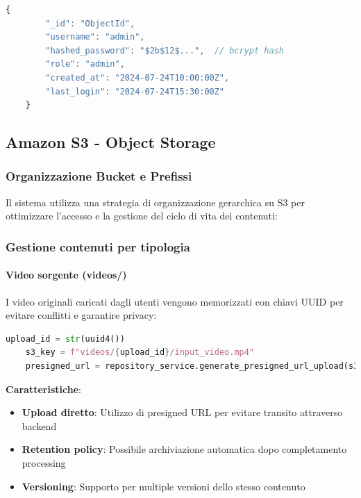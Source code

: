 \begin{lstlisting}[language=javascript, caption=Struttura utente]
	{
		"_id": "ObjectId",
		"username": "admin",
		"hashed_password": "$2b$12$...",  // bcrypt hash
		"role": "admin",
		"created_at": "2024-07-24T10:00:00Z",
		"last_login": "2024-07-24T15:30:00Z"
	}
\end{lstlisting}

\subsection{Amazon S3 - Object Storage}

\subsubsection{Organizzazione Bucket e Prefissi}

Il sistema utilizza una strategia di organizzazione gerarchica su S3 per ottimizzare l'accesso e la gestione del ciclo di vita dei contenuti:
\newline
{}

\subsubsection{Gestione contenuti per tipologia}

\paragraph{Video sorgente (videos/)}
I video originali caricati dagli utenti vengono memorizzati con chiavi UUID per evitare conflitti e garantire privacy:

\begin{lstlisting}[language=python, caption=Generazione chiave video]
	upload_id = str(uuid4())
	s3_key = f"videos/{upload_id}/input_video.mp4"
	presigned_url = repository_service.generate_presigned_url_upload(s3_key, content_type)
\end{lstlisting}

\textbf{Caratteristiche}:
\begin{itemize}
	\item \textbf{Upload diretto}: Utilizzo di presigned URL per evitare transito attraverso backend
	\item \textbf{Retention policy}: Possibile archiviazione automatica dopo completamento processing
	\item \textbf{Versioning}: Supporto per multiple versioni dello stesso contenuto
\end{itemize}

